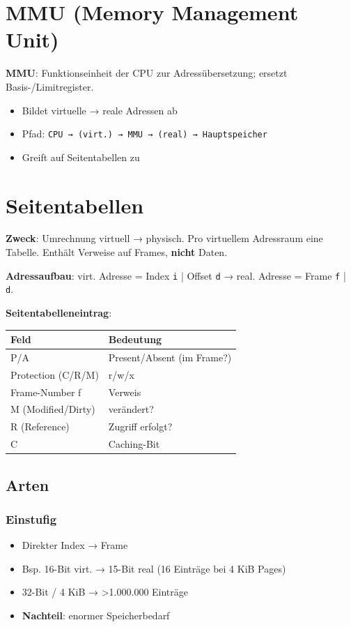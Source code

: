 \documentclass[11pt, a4paper]{article}
\begin{document}
\section{MMU (Memory Management Unit)}

\textbf{MMU}: Funktionseinheit der CPU zur Adressübersetzung; ersetzt Basis-/Limitregister.

\begin{itemize}
  \item Bildet virtuelle → reale Adressen ab
  \item Pfad: \texttt{CPU → (virt.) → MMU → (real) → Hauptspeicher}
  \item Greift auf Seitentabellen zu
\end{itemize}


\section{Seitentabellen}

\textbf{Zweck}: Umrechnung virtuell → physisch. Pro virtuellem Adressraum eine Tabelle. Enthält Verweise auf Frames, \textbf{nicht} Daten.


\textbf{Adressaufbau}: virt. Adresse = Index \texttt{i} | Offset \texttt{d} → real. Adresse = Frame \texttt{f} | \texttt{d}.


\textbf{Seitentabelleneintrag}:


{\small
\begin{tabularx}{\linewidth}{XX}
\hline
\rowcolor{tableheadbg}
{\color{white}\textbf{Feld}} & {\color{white}\textbf{Bedeutung}} \\[2pt]
\hline
\endhead
\hline
\endfoot
P/A & Present/Absent (im Frame?) \\
Protection (C/R/M) & r/w/x \\
Frame-Number f & Verweis \\
M (Modified/Dirty) & verändert? \\
R (Reference) & Zugriff erfolgt? \\
C & Caching-Bit \\
\end{tabularx}
}



\subsection{Arten}


\subsubsection{Einstufig}
\begin{itemize}
  \item Direkter Index → Frame
  \item Bsp. 16-Bit virt. → 15-Bit real (16 Einträge bei 4 KiB Pages)
  \item 32-Bit / 4 KiB → >1.000.000 Einträge
  \item \textbf{Nachteil}: enormer Speicherbedarf
\end{itemize}
\end{document}
